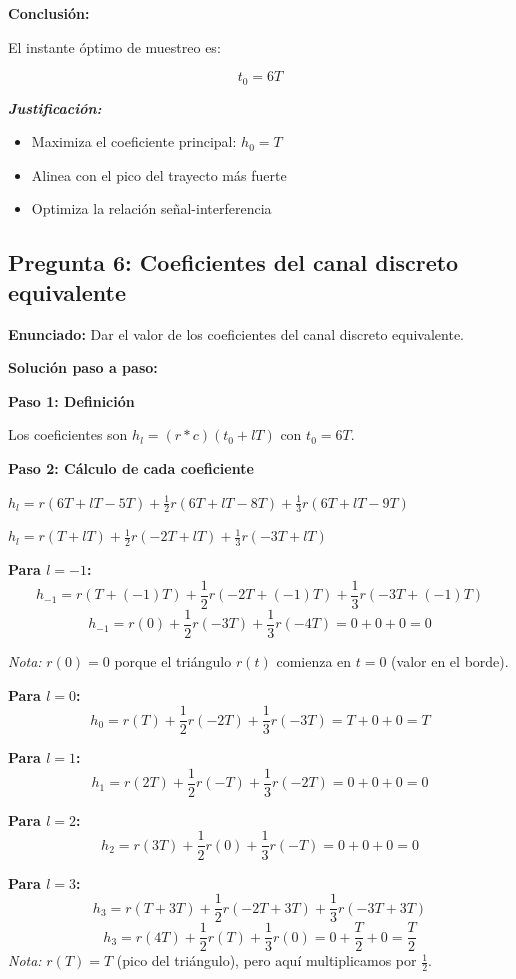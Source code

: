 \documentclass[11pt,a4paper]{article}
\begin{document}
\textbf{Conclusión:}

El instante óptimo de muestreo es:

\[
\boxed{t_0 = 6T}
\]

\textit{\textbf{Justificación:}}
\begin{itemize}
    \item Maximiza el coeficiente principal: $h_0 = T$
    \item Alinea con el pico del trayecto más fuerte
    \item Optimiza la relación señal-interferencia
\end{itemize}

\subsection*{Pregunta 6: Coeficientes del canal discreto equivalente}

\textbf{Enunciado:} Dar el valor de los coeficientes del canal discreto equivalente.

\vspace{0.3cm}
\textbf{Soluci\'on paso a paso:}

\textbf{Paso 1: Definici\'on}

Los coeficientes son $h_l = (r * c)(t_0 + lT)$ con $t_0 = 6T$.

\textbf{Paso 2: C\'alculo de cada coeficiente}

$h_l = r(6T + lT - 5T) + \frac{1}{2}r(6T + lT - 8T) + \frac{1}{3}r(6T + lT - 9T)$

$h_l = r(T + lT) + \frac{1}{2}r(-2T + lT) + \frac{1}{3}r(-3T + lT)$

\textbf{Para $l = -1$:}
\[
h_{-1} = r(T + (-1)T) + \frac{1}{2}r(-2T + (-1)T) + \frac{1}{3}r(-3T + (-1)T)
\]
\[
h_{-1} = r(0) + \frac{1}{2}r(-3T) + \frac{1}{3}r(-4T) = 0 + 0 + 0 = 0
\]

\textit{Nota:} $r(0) = 0$ porque el triángulo $r(t)$ comienza en $t=0$ (valor en el borde).

\textbf{Para $l = 0$:}
\[
h_0 = r(T) + \frac{1}{2}r(-2T) + \frac{1}{3}r(-3T) = T + 0 + 0 = T
\]

\textbf{Para $l = 1$:}
\[
h_1 = r(2T) + \frac{1}{2}r(-T) + \frac{1}{3}r(-2T) = 0 + 0 + 0 = 0
\]

\textbf{Para $l = 2$:}
\[
h_2 = r(3T) + \frac{1}{2}r(0) + \frac{1}{3}r(-T) = 0 + 0 + 0 = 0
\]

\textbf{Para $l = 3$:}
\[
h_3 = r(T + 3T) + \frac{1}{2}r(-2T + 3T) + \frac{1}{3}r(-3T + 3T)
\]
\[
h_3 = r(4T) + \frac{1}{2}r(T) + \frac{1}{3}r(0) = 0 + \frac{T}{2} + 0 = \frac{T}{2}
\]
\textit{Nota:} $r(T) = T$ (pico del triángulo), pero aquí multiplicamos por $\frac{1}{2}$.
\end{document}

